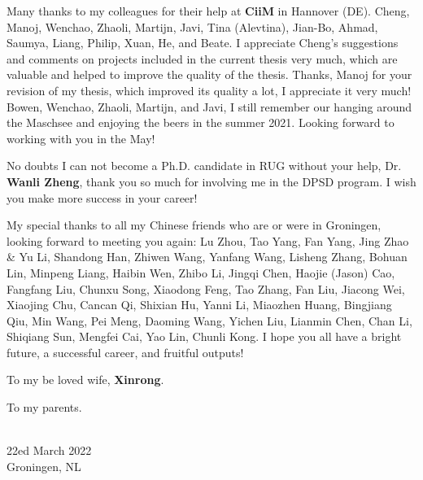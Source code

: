 \documentclass{book}
\begin{document}
\begin{refsection}
Many thanks to my colleagues for their help at \textbf{CiiM} in Hannover (DE).
Cheng, Manoj, Wenchao, Zhaoli, Martijn, Javi, Tina (Alevtina), Jian-Bo, Ahmad, Saumya, Liang, Philip, Xuan, He, and Beate.
I appreciate Cheng's suggestions and comments on projects included in the current thesis very much, which are valuable and helped to improve the quality of the thesis.
Thanks, Manoj for your revision of my thesis, which improved its quality a lot, I appreciate it very much!
Bowen, Wenchao, Zhaoli, Martijn, and Javi, I still remember our hanging around the Maschsee and enjoying the beers in the summer 2021.
Looking forward to working with you in the May!

No doubts I can not become a Ph.D. candidate in RUG without your help, Dr. \textbf{Wanli Zheng}, thank you so much for involving me in the DPSD program. I wish you make more success in your career!

My special thanks to all my Chinese friends who are or were in Groningen, looking forward to meeting you again: Lu Zhou, Tao Yang, Fan Yang, Jing Zhao \& Yu Li, Shandong Han, Zhiwen Wang, Yanfang Wang, Lisheng Zhang, Bohuan Lin, Minpeng Liang, Haibin Wen, Zhibo Li, Jingqi Chen, Haojie (Jason) Cao, Fangfang Liu, Chunxu Song, Xiaodong Feng, Tao Zhang, Fan Liu, Jiacong Wei, Xiaojing Chu, Cancan Qi, Shixian Hu, Yanni Li, Miaozhen Huang, Bingjiang Qiu, Min Wang, Pei Meng, Daoming Wang, Yichen Liu, Lianmin Chen, Chan Li, Shiqiang Sun, Mengfei Cai, Yao Lin, Chunli Kong.
I hope you all have a bright future, a successful career, and fruitful outputs!

To my be loved wife, \textbf{Xinrong}.

To my parents.
\par

\begin{flushright}
 \\
22ed March 2022 \\
Groningen, NL
\end{flushright}


\clearpage
\newpage
{}

\end{refsection}
\end{document}
